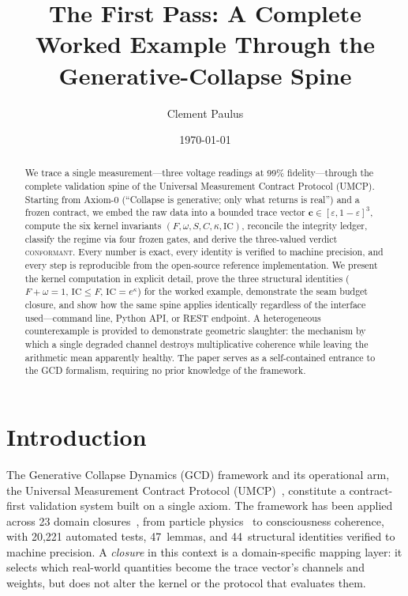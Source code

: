 \documentclass[
  aps,
  prd,
  twocolumn,
  superscriptaddress,
  nofootinbib,
  floatfix
]{revtex4-2}
\newcommand{\eps}{\varepsilon}
\newcommand{\regime}[1]{\textrm{\upshape\scshape#1}}
\newcommand{\conform}{\regime{conformant}}
\newcommand{\tvec}{\mathbf{c}}
\newcommand{\IC}{\mathrm{IC}}
\begin{document}
\title{The First Pass: A Complete Worked Example Through the
Generative-Collapse Spine}

\author{Clement Paulus}

\date{\today}

\begin{abstract}
We trace a single measurement---three voltage readings at 99\%
fidelity---through the complete validation spine of the Universal
Measurement Contract Protocol (UMCP).  Starting from Axiom-0
(``Collapse is generative; only what returns is real'') and a frozen
contract, we embed the raw data into a bounded trace vector
$\tvec \in [\eps, 1-\eps]^3$, compute the six kernel invariants
$(F, \omega, S, C, \kappa, \IC)$, reconcile the integrity ledger,
classify the regime via four frozen gates, and derive the three-valued
verdict \conform{}.  Every number is exact, every identity is verified
to machine precision, and every step is reproducible from the
open-source reference implementation.  We present the kernel
computation in explicit detail, prove the three structural identities
($F + \omega = 1$, $\IC \leq F$, $\IC = e^\kappa$) for the worked
example, demonstrate the seam budget closure, and show how the same
spine applies identically regardless of the interface used---command
line, Python API, or REST endpoint.  A heterogeneous counterexample
is provided to demonstrate geometric slaughter: the mechanism by which
a single degraded channel destroys multiplicative coherence while
leaving the arithmetic mean apparently healthy.  The paper serves as
a self-contained entrance to the GCD formalism, requiring no prior
knowledge of the framework.
\end{abstract}

\maketitle

\section{Introduction}\label{sec:intro}

The Generative Collapse Dynamics (GCD) framework and its operational
arm, the Universal Measurement Contract Protocol
(UMCP)~\cite{paulus2025umcp,paulus2025physicscoherence}, constitute a
contract-first validation system built on a single axiom.  The
framework has been applied across 23 domain
closures~\cite{umcpmetadatarepo}, from particle
physics~\cite{paulus2025physicscoherence} to consciousness coherence,
with 20{,}221 automated tests, 47~lemmas, and 44~structural
identities verified to machine precision.  A \emph{closure} in this
context is a domain-specific mapping layer: it selects which
real-world quantities become the trace vector's channels and weights,
but does not alter the kernel or the protocol that evaluates them.
\end{document}
